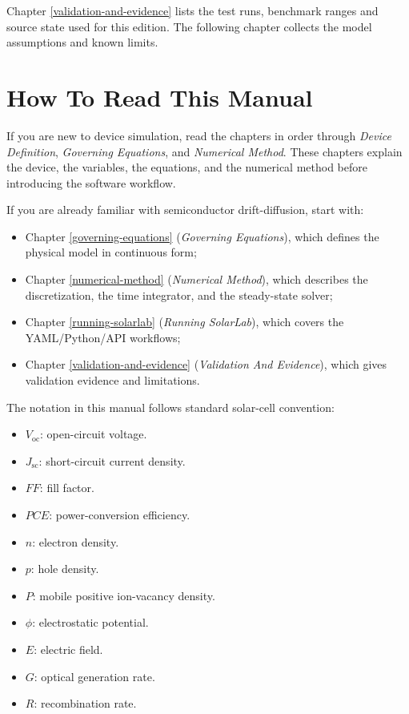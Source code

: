 \documentclass[
  11pt,
  american,
]{report}
\providecommand{\tightlist}{%
  \setlength{\itemsep}{0pt}\setlength{\parskip}{0pt}}
\begin{document}
Chapter \ref{validation-and-evidence} lists the test runs, benchmark
ranges and source state used for this edition. The following chapter
collects the model assumptions and known limits.

\hypertarget{how-to-read-this-manual}{%
\chapter{How To Read This Manual}\label{how-to-read-this-manual}}

If you are new to device simulation, read the chapters in order through
\emph{Device Definition}, \emph{Governing Equations}, and
\emph{Numerical Method}. These chapters explain the device, the
variables, the equations, and the numerical method before introducing
the software workflow.

If you are already familiar with semiconductor drift-diffusion, start
with:

\begin{itemize}
\tightlist
\item
  Chapter \ref{governing-equations} (\emph{Governing Equations}), which
  defines the physical model in continuous form;
\item
  Chapter \ref{numerical-method} (\emph{Numerical Method}), which
  describes the discretization, the time integrator, and the
  steady-state solver;
\item
  Chapter \ref{running-solarlab} (\emph{Running SolarLab}), which covers
  the YAML/Python/API workflows;
\item
  Chapter \ref{validation-and-evidence} (\emph{Validation And
  Evidence}), which gives validation evidence and limitations.
\end{itemize}

The notation in this manual follows standard solar-cell convention:

\begin{itemize}
\tightlist
\item
  \(V_\mathrm{oc}\): open-circuit voltage.
\item
  \(J_\mathrm{sc}\): short-circuit current density.
\item
  \(FF\): fill factor.
\item
  \(PCE\): power-conversion efficiency.
\item
  \(n\): electron density.
\item
  \(p\): hole density.
\item
  \(P\): mobile positive ion-vacancy density.
\item
  \(\phi\): electrostatic potential.
\item
  \(E\): electric field.
\item
  \(G\): optical generation rate.
\item
  \(R\): recombination rate.
\end{itemize}
\end{document}
